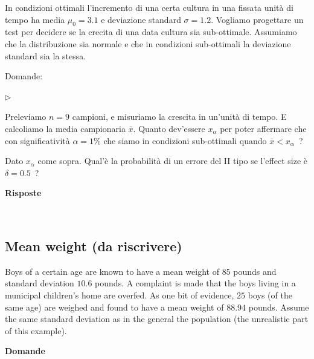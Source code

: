 \documentclass[11pt,openany]{book}
\newcommand{\mylabel}[1]{{\footnotesize\textsf{#1}}\hfill}
\renewenvironment{itemize}
  {\begin{list}{$\triangleright$}{%
   \setlength{\parskip}{0mm}
   \setlength{\topsep}{.2\baselineskip}
   \setlength{\rightmargin}{0mm}
   \setlength{\listparindent}{0mm}
   \setlength{\itemindent}{0mm}
   \setlength{\labelwidth}{3ex}
   \setlength{\itemsep}{.4\baselineskip}
   \setlength{\parsep}{0mm}
   \setlength{\partopsep}{0mm}
   \setlength{\labelsep}{1ex}
   \setlength{\leftmargin}{\labelwidth+\labelsep}
   \let\makelabel\mylabel}}{%
   \end{list}\vspace*{-1.3mm}}
\begin{document}
In condizioni ottimali l'incremento di una certa cultura in una fissata unità di tempo ha media $\mu_0=3.1$ e deviazione standard $\sigma=1.2$.
Vogliamo progettare un test per decidere se la crecita di una data cultura sia sub-ottimale. Assumiamo che la distribuzione sia normale e che in condizioni sub-ottimali la deviazione standard sia la stessa. 

Domande:

\begin{itemize}
\item[1] Preleviamo $n=9$ campioni, e misuriamo la crescita in un'unità di tempo. E calcoliamo la media campionaria $\bar x$. Quanto dev'essere $x_\alpha$ per poter affermare che con significatività $\alpha=1\%$ che siamo in condizioni sub-ottimali quando $\bar x<x_\alpha$~?
\item[2] Dato $x_\alpha$ come sopra. Qual'è la probabilità di un errore del II tipo se l'effect size è $\delta=0.5$~?
\end{itemize}

\textbf{Risposte}





\clearpage\
\subsection{Mean weight (da riscrivere)}

Boys of a certain age are known to have a mean weight of $85$ pounds and standard deviation $10.6$ pounds. A complaint is made that the boys living in a municipal children's home are overfed. As one bit of evidence, $25$ boys (of the same age) are weighed and found to have a mean weight of $88.94$ pounds. Assume the same standard deviation as in the general the population (the unrealistic part of this example).


\textbf{Domande}
\end{document}
